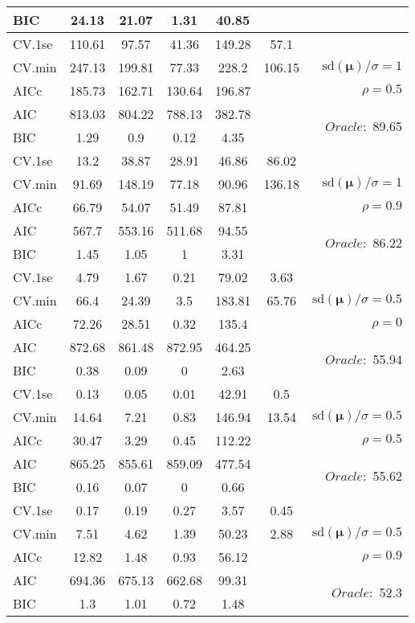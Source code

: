 \begin{table}
\begin{center}
\begin{tabular}{l*{5}{c}|r}
BIC & 24.13 & 21.07 & 1.31 & 40.85 & &  \\
 \hline 
CV.1se & 110.61 & 97.57 & 41.36 & 149.28 & 57.1 & \\
CV.min & 247.13 & 199.81 & 77.33 & 228.2 & 106.15 &  $\mathrm{sd}(\mathbf{\mu})/\sigma=1$ \\
AICc & 185.73 & 162.71 & 130.64 & 196.87 & & $\rho=0.5$ \\
AIC & 813.03 & 804.22 & 788.13 & 382.78 & &  \multirow{2}{*}{$Oracle: $ 89.65} \\
BIC & 1.29 & 0.9 & 0.12 & 4.35 & &  \\
 \hline 
CV.1se & 13.2 & 38.87 & 28.91 & 46.86 & 86.02 & \\
CV.min & 91.69 & 148.19 & 77.18 & 90.96 & 136.18 &  $\mathrm{sd}(\mathbf{\mu})/\sigma=1$ \\
AICc & 66.79 & 54.07 & 51.49 & 87.81 & & $\rho=0.9$ \\
AIC & 567.7 & 553.16 & 511.68 & 94.55 & &  \multirow{2}{*}{$Oracle: $ 86.22} \\
BIC & 1.45 & 1.05 & 1 & 3.31 & &  \\
 \hline 
CV.1se & 4.79 & 1.67 & 0.21 & 79.02 & 3.63 & \\
CV.min & 66.4 & 24.39 & 3.5 & 183.81 & 65.76 &  $\mathrm{sd}(\mathbf{\mu})/\sigma=0.5$ \\
AICc & 72.26 & 28.51 & 0.32 & 135.4 & & $\rho=0$ \\
AIC & 872.68 & 861.48 & 872.95 & 464.25 & &  \multirow{2}{*}{$Oracle: $ 55.94} \\
BIC & 0.38 & 0.09 & 0 & 2.63 & &  \\
 \hline 
CV.1se & 0.13 & 0.05 & 0.01 & 42.91 & 0.5 & \\
CV.min & 14.64 & 7.21 & 0.83 & 146.94 & 13.54 &  $\mathrm{sd}(\mathbf{\mu})/\sigma=0.5$ \\
AICc & 30.47 & 3.29 & 0.45 & 112.22 & & $\rho=0.5$ \\
AIC & 865.25 & 855.61 & 859.09 & 477.54 & &  \multirow{2}{*}{$Oracle: $ 55.62} \\
BIC & 0.16 & 0.07 & 0 & 0.66 & &  \\
 \hline 
CV.1se & 0.17 & 0.19 & 0.27 & 3.57 & 0.45 & \\
CV.min & 7.51 & 4.62 & 1.39 & 50.23 & 2.88 &  $\mathrm{sd}(\mathbf{\mu})/\sigma=0.5$ \\
AICc & 12.82 & 1.48 & 0.93 & 56.12 & & $\rho=0.9$ \\
AIC & 694.36 & 675.13 & 662.68 & 99.31 & &  \multirow{2}{*}{$Oracle: $ 52.3} \\
BIC & 1.3 & 1.01 & 0.72 & 1.48 & &  \\
 \hline 
\end{tabular}
\end{center}
\vspace{-1cm}
\end{table}




